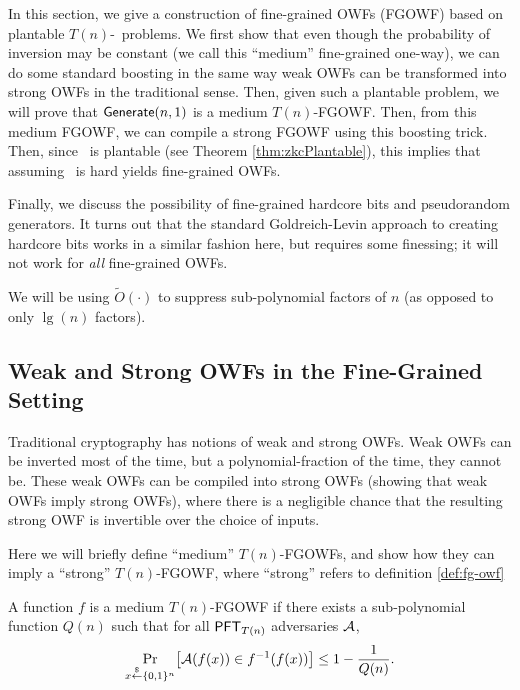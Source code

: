 

In this section, we give a construction of fine-grained OWFs (FGOWF) based on plantable $T(n)$-\ACIH~problems. We first show that even though the probability of inversion may be constant (we call this ``medium'' fine-grained one-way), we can do some standard boosting in the same way weak OWFs can be transformed into strong OWFs in the traditional sense. Then, given such a plantable problem, we will prove that $\mathsf{Generate}(n,1)$ is a medium $T(n)$-FGOWF. Then, from this medium FGOWF, we can compile a strong FGOWF using this boosting trick. Then, since \zkclique~is plantable (see Theorem \ref{thm:zkcPlantable}), this implies that assuming \zkclique~is hard yields fine-grained OWFs.

Finally, we discuss the possibility of fine-grained hardcore bits and pseudorandom generators. It turns out that the standard Goldreich-Levin \cite{hardCoreBitsAndXorLemmaFromGL} approach to creating hardcore bits works in a similar fashion here, but requires some finessing; it will not work for \emph{all} fine-grained OWFs.

We will be using $\tilde{O}(\cdot)$ to suppress sub-polynomial factors of $n$ (as opposed to only $\lg(n)$ factors). 

\subsection{Weak and Strong OWFs in the Fine-Grained Setting}

Traditional cryptography has notions of weak and strong OWFs. Weak OWFs can be inverted most of the time, but a polynomial-fraction of the time, they cannot be. These weak OWFs can be compiled into strong OWFs (showing that weak OWFs imply strong OWFs), where there is a negligible chance that the resulting strong OWF is invertible over the choice of inputs.

Here we will briefly define ``medium'' $T(n)$-FGOWFs, and show how they can imply a ``strong'' $T(n)$-FGOWF, where ``strong'' refers to definition \ref{def:fg-owf}

\begin{definition}
	A function $f$ is a medium $T(n)$-FGOWF if there exists a sub-polyno\-mial function $Q(n)$ such that for all $\mathsf{PFT}_{T(n)}$ adversaries $\mathcal{A}$,
	\[ \Pr_{x \stackrel{\scriptscriptstyle{\$}}{\gets} \{0,1\}^n}\bigl[ \mathcal{A}(f(x)) \in f^{-1}(f(x)) \bigr] \le 1 - \frac 1 {Q(n)}. \]
\end{definition}

